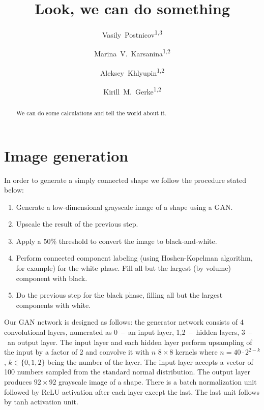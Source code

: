 \documentclass[reprint,amsmath,amssymb,aps,pre,showkeys,showpacs]{revtex4-1}
\begin{document}

\author{Vasily~Postnicov\textsuperscript{1,3}}
\author{Marina~V.~Karsanina\textsuperscript{1,2}}
\author{Aleksey~Khlyupin\textsuperscript{1,2}}
\author{Kirill~M.~Gerke\textsuperscript{1,2}}


\title{Look, we can do something}

\begin{abstract}
We can do some calculations and tell the world about it.
\end{abstract}


\maketitle

\section{Image generation}
In order to generate a simply connected shape we follow the procedure stated
below:
\begin{enumerate}
\item Generate a low-dimensional grayscale image of a shape using a
  GAN\cite{goodfellow2020generative}.
\item Upscale the result of the previous step.
\item Apply a 50\% threshold to convert the image to black-and-white.
\item Perform connected component labeling (using Hoshen-Kopelman
  algorithm\cite{hoshen1976percolation}, for example) for the white phase. Fill
  all but the largest (by volume) component with black.
\item Do the previous step for the black phase, filling all but the largest
  components with white.
\end{enumerate}

Our GAN network is designed as follows: the generator network consists of 4
convolutional layers, numerated as 0~--~an input layer, 1,2~--~hidden layers,
3~--~an output layer. The input layer and each hidden layer perform upsampling
of the input by a factor of 2 and convolve it with $n$ $8 \times 8$ kernels
where $n = 40 \cdot 2^{2-k}$, $k \in \{0, 1, 2\}$ being the number of the
layer. The input layer accepts a vector of 100 numbers sampled from the standard
normal distribution. The output layer produces $92 \times 92$ grayscale image of
a shape. There is a batch normalization\cite{ioffe2015batch} unit followed by
ReLU\cite{4082265} activation after each layer except the last. The last unit
follows by tanh activation unit.
\end{document}
